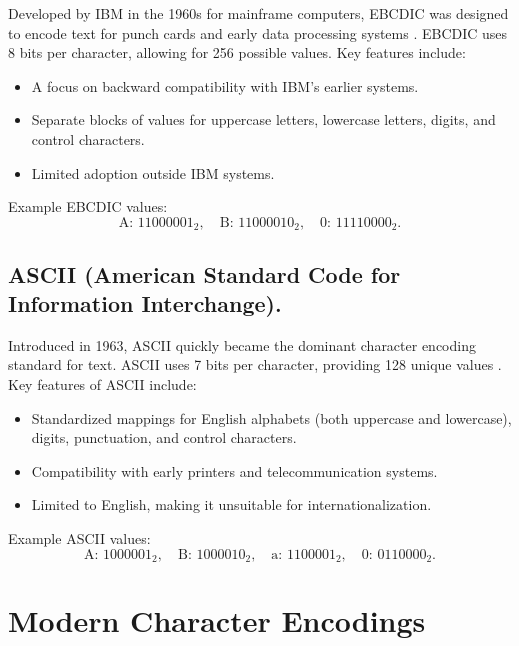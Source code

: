 Developed by IBM in the 1960s for mainframe computers, EBCDIC was designed to encode text for punch cards and early data processing systems \cite{ibm1964ebcdic}. EBCDIC uses 8 bits per character, allowing for 256 possible values. Key features include:
\begin{itemize}
    \item A focus on backward compatibility with IBM's earlier systems.
    \item Separate blocks of values for uppercase letters, lowercase letters, digits, and control characters.
    \item Limited adoption outside IBM systems.
\end{itemize}

Example EBCDIC values:
\[
\text{A: } 11000001_2, \quad \text{B: } 11000010_2, \quad \text{0: } 11110000_2.
\]

\subsection{ASCII (American Standard Code for Information Interchange).}
Introduced in 1963, ASCII quickly became the dominant character encoding standard for text. ASCII uses 7 bits per character, providing 128 unique values \cite{mackenzie1980coded}. Key features of ASCII include:
\begin{itemize}
    \item Standardized mappings for English alphabets (both uppercase and lowercase), digits, punctuation, and control characters.
    \item Compatibility with early printers and telecommunication systems.
    \item Limited to English, making it unsuitable for internationalization.
\end{itemize}

Example ASCII values:
\[
\text{A: } 1000001_2, \quad \text{B: } 1000010_2, \quad \text{a: } 1100001_2, \quad \text{0: } 0110000_2.
\]

\section{Modern Character Encodings}
